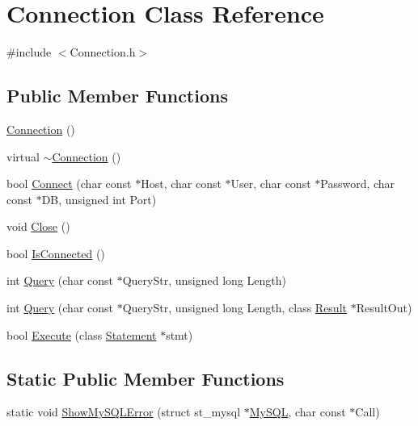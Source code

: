 \hypertarget{class_connection}{}\section{Connection Class Reference}
\label{class_connection}


{\ttfamily \#include $<$Connection.\+h$>$}

\subsection*{Public Member Functions}
\begin{DoxyCompactItemize}
\item 
\hyperlink{class_connection_a9de94289ca6259f94ef6aeba3b134a77}{Connection} ()
\item 
virtual \hyperlink{class_connection_a2e4352edf667bea83001569e9da8a24d}{$\sim$\+Connection} ()
\item 
bool \hyperlink{class_connection_aaa6f9b14267bb48e1c778c9a0c822d50}{Connect} (char const $\ast$Host, char const $\ast$User, char const $\ast$Password, char const $\ast$D\+B, unsigned int Port)
\item 
void \hyperlink{class_connection_ab47840ece7746e9de9eb78d3c9ac2a7a}{Close} ()
\item 
bool \hyperlink{class_connection_a7fa9d2baa3c0b5e1ac2e1f2d3349b2c9}{Is\+Connected} ()
\item 
int \hyperlink{class_connection_ad726e959bdbbde0760119401c0f78811}{Query} (char const $\ast$Query\+Str, unsigned long Length)
\item 
int \hyperlink{class_connection_adbb24f87d4095a4a696719add9115209}{Query} (char const $\ast$Query\+Str, unsigned long Length, class \hyperlink{class_result}{Result} $\ast$Result\+Out)
\item 
bool \hyperlink{class_connection_a32cc6f6ed8cfc166b70d4c69e6be98a3}{Execute} (class \hyperlink{class_statement}{Statement} $\ast$stmt)
\end{DoxyCompactItemize}
\subsection*{Static Public Member Functions}
\begin{DoxyCompactItemize}
\item 
static void \hyperlink{class_connection_aefda5ba6f84c197f4c751a2ef862a66c}{Show\+My\+S\+Q\+L\+Error} (struct st\+\_\+mysql $\ast$\hyperlink{class_connection_a1a7ed2eaaab5159293008dea06dce9e8}{My\+S\+Q\+L}, char const $\ast$Call)
\end{DoxyCompactItemize}
